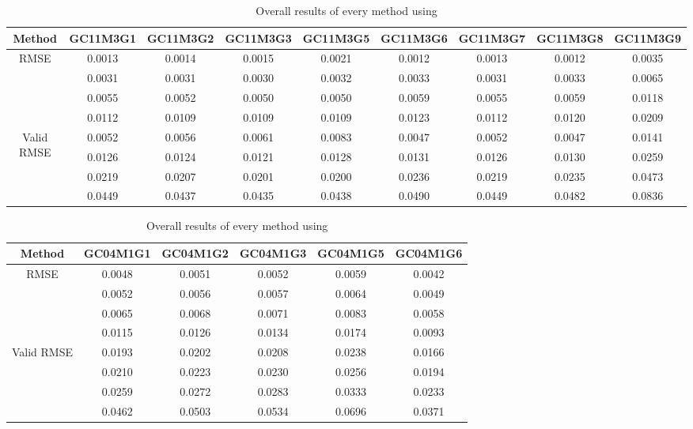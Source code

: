 \begin{table}[ht!]
\centering
\begin{tabular}{c|c|c|c|c|c|c|c|c}
Method & \scriptsize{GC11M3G1} & \scriptsize{GC11M3G2} & \scriptsize{GC11M3G3} & \scriptsize{GC11M3G5} & \scriptsize{GC11M3G6} & \scriptsize{GC11M3G7} & \scriptsize{GC11M3G8} & \scriptsize{GC11M3G9}\\ \hline 
\multirow{4}{*}{RMSE} & 0.0013 & 0.0014 & 0.0015 & 0.0021 & 0.0012 & 0.0013 & 0.0012 & 0.0035 \\ 
 & 0.0031 & 0.0031 & 0.0030 & 0.0032 & 0.0033 & 0.0031 & 0.0033 & 0.0065 \\ 
 & 0.0055 & 0.0052 & 0.0050 & 0.0050 & 0.0059 & 0.0055 & 0.0059 & 0.0118 \\ 
 & 0.0112 & 0.0109 & 0.0109 & 0.0109 & 0.0123 & 0.0112 & 0.0120 & 0.0209 \\ 
 \hline
\multirow{4}{*}{Valid RMSE} & 0.0052 & 0.0056 & 0.0061 & 0.0083 & 0.0047 & 0.0052 & 0.0047 & 0.0141 \\ 
 & 0.0126 & 0.0124 & 0.0121 & 0.0128 & 0.0131 & 0.0126 & 0.0130 & 0.0259 \\ 
 & 0.0219 & 0.0207 & 0.0201 & 0.0200 & 0.0236 & 0.0219 & 0.0235 & 0.0473 \\ 
 & 0.0449 & 0.0437 & 0.0435 & 0.0438 & 0.0490 & 0.0449 & 0.0482 & 0.0836 \\ 
 \hline 
\end{tabular}
\caption{Overall results of every method using }
\label{tab:GC11M3}
\end{table}


\begin{table}[ht!]
\centering
\begin{tabular}{c|c|c|c|c|c}
Method & \scriptsize{GC04M1G1} & \scriptsize{GC04M1G2} & \scriptsize{GC04M1G3} & \scriptsize{GC04M1G5} & \scriptsize{GC04M1G6}\\ \hline 
\multirow{4}{*}{RMSE} & 0.0048 & 0.0051 & 0.0052 & 0.0059 & 0.0042 \\ 
 & 0.0052 & 0.0056 & 0.0057 & 0.0064 & 0.0049 \\ 
 & 0.0065 & 0.0068 & 0.0071 & 0.0083 & 0.0058 \\ 
 & 0.0115 & 0.0126 & 0.0134 & 0.0174 & 0.0093 \\ 
 \hline
\multirow{4}{*}{Valid RMSE} & 0.0193 & 0.0202 & 0.0208 & 0.0238 & 0.0166 \\ 
 & 0.0210 & 0.0223 & 0.0230 & 0.0256 & 0.0194 \\ 
 & 0.0259 & 0.0272 & 0.0283 & 0.0333 & 0.0233 \\ 
 & 0.0462 & 0.0503 & 0.0534 & 0.0696 & 0.0371 \\ 
 \hline 
\end{tabular}
\caption{Overall results of every method using }
\label{tab:GC04M1}
\end{table}


